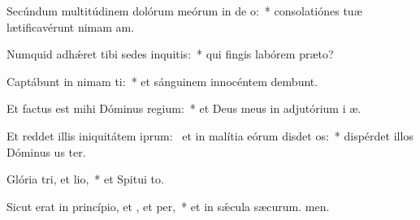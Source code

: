 \item Secúndum multitúdinem dolórum meórum in de o:~* consolatiónes tuæ lætificavérunt nimam am.
\item Numquid adhǽret tibi sedes inquitis:~* qui fingis labórem  præto?
\item Captábunt in nimam ti:~* et sánguinem innocéntem dembunt.
\item Et factus est mihi Dóminus  regium:~* et Deus meus in adjutórium i æ.
\item Et reddet illis iniquitátem iprum:~\pscross{} et in malítia eórum disdet os:~* dispérdet illos Dóminus us ter.
\item Glória tri, et lio,~* et Spitui to.
\item Sicut erat in princípio, et , et per,~* et in sǽcula sæcurum. men.
